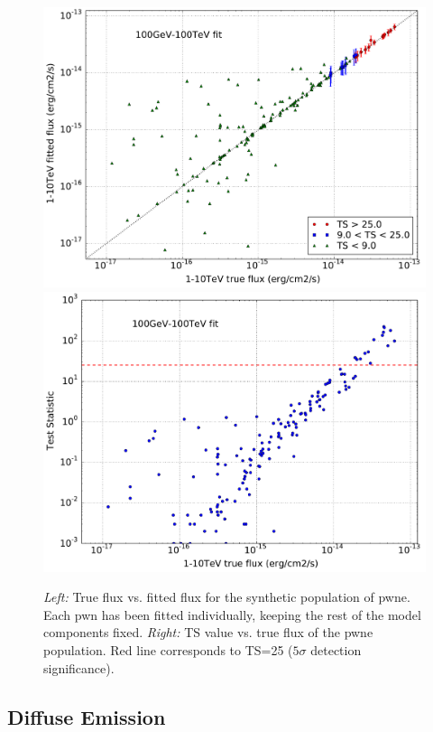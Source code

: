 \documentclass[main.tex]{subfiles}
\begin{document}
\begin{figure}[h!]
\centering
{}
\includegraphics[width=1\textwidth]{Pictures/PWNe-only_Flux_100GeV-100TeV_Asimov.pdf}
\endminipage 
{}
\includegraphics[width=1\textwidth]{Pictures/PWNe-only_TS_100GeV-100TeV_Asimov.pdf}
\endminipage
  \caption{\textit{Left:} True flux vs. fitted flux for the synthetic population of \gls{pwne}. Each \gls{pwn} has been fitted individually, keeping the rest of the model components fixed. \textit{Right:} TS value vs. true flux of the \gls{pwne} population. Red line corresponds to TS=25 ($5\sigma$ detection significance).}
    \label{fig:pwnepopresults}
\end{figure}

\subsection{Diffuse Emission}
\end{document}
